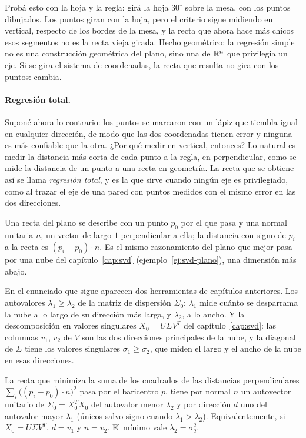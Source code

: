 Probá esto con la hoja y la regla: girá la hoja \(30^\circ\) sobre la mesa, con los puntos
dibujados. Los puntos giran con la hoja, pero el criterio sigue midiendo en vertical, respecto
de los bordes de la mesa, y la recta que ahora hace más chicos esos segmentos no es la recta
vieja girada. Hecho geométrico: la regresión simple no es una construcción geométrica del
plano, sino una de \(\mathbb{R}^n\) que privilegia un eje. Si se gira el sistema de coordenadas, la
recta que resulta no gira con los puntos: cambia.

\paragraph{Regresión total.} Suponé ahora lo contrario: los puntos se marcaron con un lápiz
que tiembla igual en cualquier dirección, de modo que las dos coordenadas tienen error y
ninguna es más confiable que la otra. ¿Por qué medir en vertical, entonces? Lo natural es
medir la distancia más corta de cada punto a la regla, en perpendicular, como se mide la
distancia de un punto a una recta en geometría. La recta que se obtiene así se llama
\emph{regresión total}, y es la que sirve cuando ningún eje es privilegiado, como al trazar el
eje de una pared con puntos medidos con el mismo error en las dos direcciones.

Una recta del plano se describe con un punto \(p_0\) por el que pasa y una normal unitaria
\(n\), un vector de largo \(1\) perpendicular a ella; la distancia con signo de \(p_i\) a la
recta es \((p_i-p_0)\cdot n\). Es el mismo razonamiento del plano que mejor pasa por una nube del
capítulo~\ref{cap:svd} (ejemplo~\ref{ej:svd-plano}), una dimensión más abajo.

En el enunciado que sigue aparecen dos herramientas de capítulos anteriores. Los autovalores
\(\lambda_1\ge\lambda_2\) de la matriz de dispersión \(\Sigma_0\): \(\lambda_1\) mide cuánto se
desparrama la nube a lo largo de su dirección más larga, y \(\lambda_2\), a lo ancho. Y la
descomposición en valores singulares \(X_0=U\Sigma V^T\) del capítulo~\ref{cap:svd}: las
columnas \(v_1\), \(v_2\) de \(V\) son las dos direcciones principales de la nube, y la
diagonal de \(\Sigma\) tiene los valores singulares \(\sigma_1\ge\sigma_2\), que miden el largo
y el ancho de la nube en esas direcciones.

\begin{proposicion}\label{prop:cp-regresion-total}
La recta que minimiza la suma de los cuadrados de las distancias perpendiculares
\(\sum_i\big((p_i-p_0)\cdot n\big)^2\) pasa por el baricentro \(\bar p\), tiene por normal
\(n\) un autovector unitario de \(\Sigma_0=X_0^TX_0\) del autovalor menor \(\lambda_2\) y por dirección
\(d\) uno del autovalor mayor \(\lambda_1\) (únicos salvo signo cuando \(\lambda_1>\lambda_2\)). Equivalentemente, si \(X_0=U\Sigma V^T\),
\(d=v_1\) y \(n=v_2\). El mínimo vale \(\lambda_2=\sigma_2^2\).
\end{proposicion}

